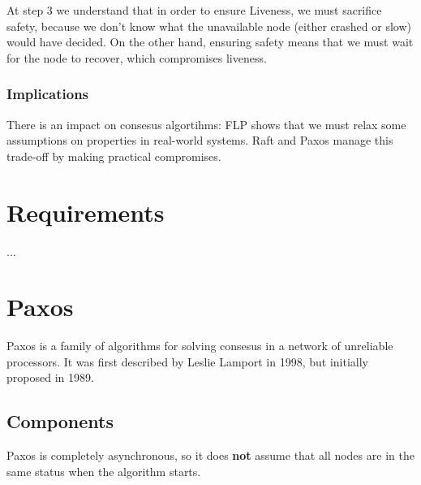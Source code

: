 At step 3 we understand that in order to ensure Liveness, we must sacrifice safety, because we don't know what the unavailable node (either crashed or slow) would have decided.
On the other hand, ensuring safety means that we must wait for the node to recover, which compromises liveness.

\subsubsection{Implications}
There is an impact on consesus algortihms:
FLP shows that we must relax some assumptions on properties in real-world systems.
Raft and Paxos manage this trade-off by making practical compromises. 


\section{Requirements}
...

\section{Paxos}
Paxos is a family of algorithms for solving consesus in a network of unreliable processors.
It was first described by Leslie Lamport in 1998, but initially proposed in 1989.

\subsection{Components}

Paxos is completely asynchronous, so it does \textbf{not} assume that all nodes are in the same status when the algorithm starts.


